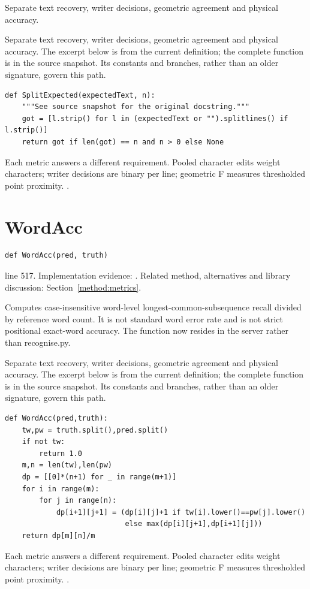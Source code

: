 Separate text recovery, writer decisions, geometric agreement and physical accuracy.


Separate text recovery, writer decisions, geometric agreement and physical accuracy. The excerpt below is from the current definition; the complete function is in the source snapshot. Its constants and branches, rather than an older signature, govern this path.


\begin{lstlisting}[style=plain]
def SplitExpected(expectedText, n):
    """See source snapshot for the original docstring."""
    got = [l.strip() for l in (expectedText or "").splitlines() if l.strip()]
    return got if len(got) == n and n > 0 else None
\end{lstlisting}
Each metric answers a different requirement. Pooled character edits weight characters; writer decisions are binary per line; geometric F measures thresholded point proximity. \cite{levenshtein1966,tanksmetric,nistinterval}.


\section{WordAcc}\label{fn:web-server:WordAcc}
\begin{lstlisting}[style=sig]
def WordAcc(pred, truth)
\end{lstlisting}
 line 517. Implementation evidence: \cite{code2026}. Related method, alternatives and library discussion: Section~\ref{method:metrics}.


Computes case-insensitive word-level longest-common-subsequence recall divided by reference word count. It is not standard word error rate and is not strict positional exact-word accuracy. The function now resides in the server rather than recognise.py.


Separate text recovery, writer decisions, geometric agreement and physical accuracy. The excerpt below is from the current definition; the complete function is in the source snapshot. Its constants and branches, rather than an older signature, govern this path.


\begin{lstlisting}[style=plain]
def WordAcc(pred,truth):
    tw,pw = truth.split(),pred.split()
    if not tw:
        return 1.0
    m,n = len(tw),len(pw)
    dp = [[0]*(n+1) for _ in range(m+1)]
    for i in range(m):
        for j in range(n):
            dp[i+1][j+1] = (dp[i][j]+1 if tw[i].lower()==pw[j].lower()
                            else max(dp[i][j+1],dp[i+1][j]))
    return dp[m][n]/m
\end{lstlisting}
Each metric answers a different requirement. Pooled character edits weight characters; writer decisions are binary per line; geometric F measures thresholded point proximity. \cite{levenshtein1966,tanksmetric,nistinterval}.



